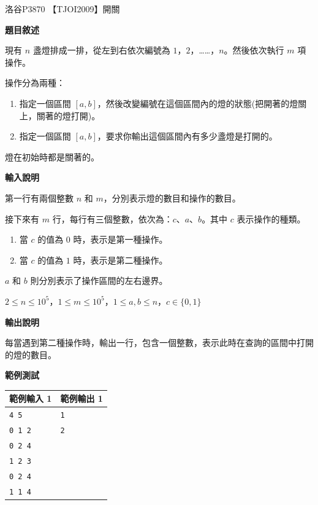     \problem 洛谷P3870 【TJOI2009】開關

    \textbf{題目敘述}

    現有 $n$ 盞燈排成一排，從左到右依次編號為 $1$，$2$，……，$n$。然後依次執行 $m$ 項操作。

    操作分為兩種：
    \begin{enumerate}
        \item 指定一個區間 $[a,b]$，然後改變編號在這個區間內的燈的狀態(把開著的燈關上，關著的燈打開)。
        \item 指定一個區間 $[a,b]$，要求你輸出這個區間內有多少盞燈是打開的。
    \end{enumerate}
    
    燈在初始時都是關著的。

    \textbf{輸入說明}

    第一行有兩個整數 $n$ 和 $m$，分別表示燈的數目和操作的數目。

    接下來有 $m$ 行，每行有三個整數，依次為：$c$、$a$、$b$。其中 $c$ 表示操作的種類。

    \begin{enumerate}
        \item 當 $c$ 的值為 $0$ 時，表示是第一種操作。
        \item 當 $c$ 的值為 $1$ 時，表示是第二種操作。
    \end{enumerate}

    $a$ 和 $b$ 則分別表示了操作區間的左右邊界。

    $2\le n\le 10^5$，$1\le m\le 10^5$，$1\le a,b\le n$，$c\in \{0,1\}$

    \textbf{輸出說明}

    每當遇到第二種操作時，輸出一行，包含一個整數，表示此時在查詢的區間中打開的燈的數目。

    \textbf{範例測試}

    \begin{tabular}{|m{7cm}|m{7cm}|}
        \hline
        範例輸入 1 & 範例輸出 1 \\
        \hline
        \verb|4 5|  & \verb|1| \\
        \verb|0 1 2|  & \verb|2| \\
        \verb|0 2 4|  & \\
        \verb|1 2 3|  &\\
        \verb|0 2 4|  & \\
        \verb|1 1 4|  &\\
        \hline
    \end{tabular}

